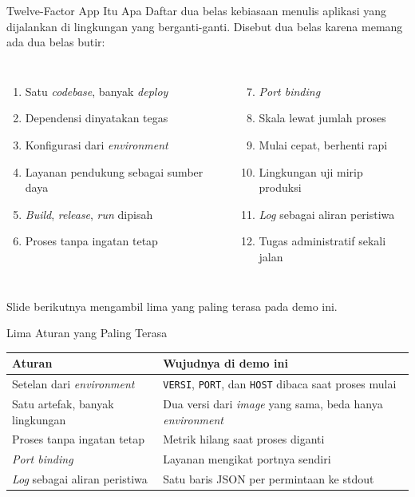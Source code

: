 \documentclass[aspectratio=169, table, 12pt]{beamer}
\begin{document}
\begin{frame}{{\Large Twelve-Factor App Itu Apa}}
  \vspace{8pt}
  {\small Daftar dua belas kebiasaan menulis aplikasi yang dijalankan di
  lingkungan yang berganti-ganti. Disebut dua belas karena memang ada dua
  belas butir:}
  \vspace{6pt}
  \begin{columns}[t]
    {\footnotesize
    \begin{enumerate}
      \item Satu \textit{codebase}, banyak \textit{deploy}
      \item Dependensi dinyatakan tegas
      \item Konfigurasi dari \textit{environment}
      \item Layanan pendukung sebagai sumber daya
      \item \textit{Build}, \textit{release}, \textit{run} dipisah
      \item Proses tanpa ingatan tetap
    \end{enumerate}}

    {\footnotesize
    \begin{enumerate}
      \setcounter{enumi}{6}
      \item \textit{Port binding}
      \item Skala lewat jumlah proses
      \item Mulai cepat, berhenti rapi
      \item Lingkungan uji mirip produksi
      \item \textit{Log} sebagai aliran peristiwa
      \item Tugas administratif sekali jalan
    \end{enumerate}}
  \end{columns}
  \vspace{4pt}
  {\small Slide berikutnya mengambil lima yang paling terasa pada demo ini.}
\end{frame}

\begin{frame}{{\Large Lima Aturan yang Paling Terasa}}
  \vspace{6pt}
  \centering
  {\footnotesize
  \begin{tabularx}{\textwidth}{lY}
    \hline
    \textbf{Aturan} & \textbf{Wujudnya di demo ini} \\
    \hline
    Setelan dari \textit{environment} & \texttt{VERSI}, \texttt{PORT}, dan \texttt{HOST} dibaca saat proses mulai \\
    \hline
    Satu artefak, banyak lingkungan & Dua versi dari \textit{image} yang sama, beda hanya \textit{environment} \\
    \hline
    Proses tanpa ingatan tetap & Metrik hilang saat proses diganti \\
    \hline
    \textit{Port binding} & Layanan mengikat portnya sendiri \\
    \hline
    \textit{Log} sebagai aliran peristiwa & Satu baris JSON per permintaan ke stdout \\
    \hline
  \end{tabularx}}
\end{frame}
\end{document}
